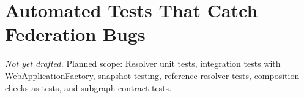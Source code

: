 \chapter{Automated Tests That Catch Federation Bugs}
\label{ch:automated-tests}

\emph{Not yet drafted.} Planned scope: Resolver unit tests, integration tests with WebApplicationFactory, snapshot testing, reference-resolver tests, composition checks as tests, and subgraph contract tests.

% 
